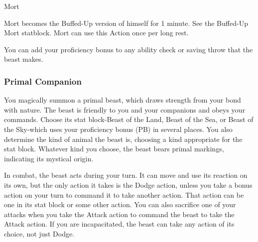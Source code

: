 {\begin{DndMonster}[width=0.5\textwidth]{Mort}
	\renewcommand{\AbilityScoreSpacer}{~}
    \DndMonsterAbilityScores[
		str = 6,
		dex = 16,
		con = 10,
		int = 8,
		wis = 8,
		cha = 16,
    ]

    \DndMonsterDetails[
        saving-throws = {Dex +3 + PB (\ProficiencyValue)},
        skills = {Stealth +3 + (2 x PB (\ProficiencyValue)), Deception +1 + PB (\ProficiencyValue)},
        senses = {Darkvision 60 ft., Passive Perception 12},
        languages = {understands the languages you speak},
        challenge = 1,
    ]
    
    Mort becomes the Buffed-Up version of himself for 1 minute. See the Buffed-Up Mort statblock. Mort can use this Action once per long rest.
    
    You can add your proficiency bonus to any ability check or saving throw that the beast makes.
	
	\DndMonsterAttack[
      name=Pounce,
      distance=melee, %
      mod=\calculateSpellAttack{\calculateModifier{\WisdomScoreValue}},
      reach=5,
      targets=one target,
      dmg=\DndDice{1d4 - 2} + PB (\ProficiencyValue),
      dmg-type=bludgeoning,
    ]	
\end{DndMonster}
\subsubsection*{Primal Companion}
You magically summon a primal beast, which draws strength from your bond with nature. The beast is friendly to you and your companions and obeys your commands. Choose its stat block-Beast of the Land, Beast of the Sea, or Beast of the Sky-which uses your proficiency bonus (PB) in several places. You also determine the kind of animal the beast is, choosing a kind appropriate for the stat block. Whatever kind you choose, the beast bears primal markings, indicating its mystical origin.

In combat, the beast acts during your turn. It can move and use its reaction on its own, but the only action it takes is the Dodge action, unless you take a bonus action on your turn to command it to take another action. That action can be one in its stat block or some other action. You can also sacrifice one of your attacks when you take the Attack action to command the beast to take the Attack action. If you are incapacitated, the beast can take any action of its choice, not just Dodge.

}
